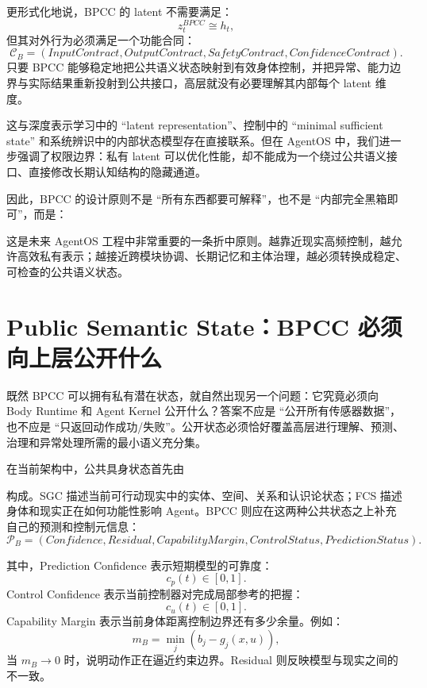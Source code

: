 更形式化地说，BPCC 的 latent 不需要满足：
\[
z_t^{BPCC}
\cong
h_t,
\]
但其对外行为必须满足一个功能合同：
\[
\mathcal C_B
=
(
InputContract,
OutputContract,
SafetyContract,
ConfidenceContract
).
\]
只要 BPCC 能够稳定地把公共语义状态映射到有效身体控制，并把异常、能力边界与实际结果重新投射到公共接口，高层就没有必要理解其内部每个 latent 维度。

这与深度表示学习中的 ``latent representation''、控制中的 ``minimal sufficient state'' 和系统辨识中的内部状态模型存在直接联系。但在 AgentOS 中，我们进一步强调了权限边界：私有 latent 可以优化性能，却不能成为一个绕过公共语义接口、直接修改长期认知结构的隐藏通道。

因此，BPCC 的设计原则不是 ``所有东西都要可解释''，也不是 ``内部完全黑箱即可''，而是：
\begin{statementbox}
\centering
{}
\end{statementbox}
这是未来 AgentOS 工程中非常重要的一条折中原则。越靠近现实高频控制，越允许高效私有表示；越接近跨模块协调、长期记忆和主体治理，越必须转换成稳定、可检查的公共语义状态。

\section{Public Semantic State：BPCC 必须向上层公开什么}

既然 BPCC 可以拥有私有潜在状态，就自然出现另一个问题：它究竟必须向 Body Runtime 和 Agent Kernel 公开什么？答案不应是 ``公开所有传感器数据''，也不应是 ``只返回动作成功/失败''。公开状态必须恰好覆盖高层进行理解、预测、治理和异常处理所需的最小语义充分集。

在当前架构中，公共具身状态首先由
\begin{statementbox}
\centering
{}
\end{statementbox}
构成。SGC 描述当前可行动现实中的实体、空间、关系和认识论状态；FCS 描述身体和现实正在如何功能性影响 Agent。BPCC 则应在这两种公共状态之上补充自己的预测和控制元信息：
\[
\mathcal P_B
=
(
Confidence,
Residual,
CapabilityMargin,
ControlStatus,
PredictionStatus
).
\]

其中，Prediction Confidence 表示短期模型的可靠度：
\[
c_p(t)\in[0,1].
\]
Control Confidence 表示当前控制器对完成局部参考的把握：
\[
c_u(t)\in[0,1].
\]
Capability Margin 表示当前身体距离控制边界还有多少余量。例如：
\[
m_B
=
\min_j
\left(
b_j-g_j(x,u)
\right),
\]
当 $m_B\rightarrow0$ 时，说明动作正在逼近约束边界。Residual 则反映模型与现实之间的不一致。


